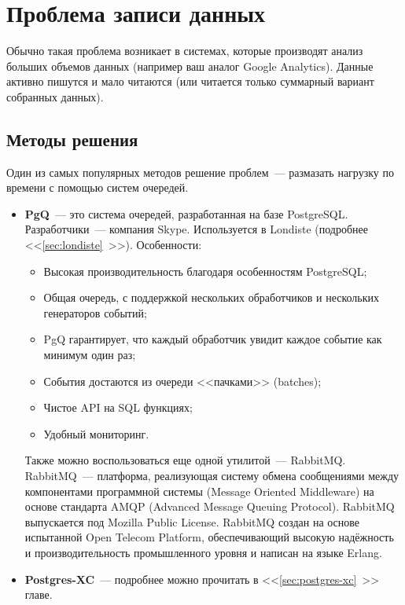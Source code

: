 \section{Проблема записи данных}

Обычно такая проблема возникает в системах, которые производят анализ больших объемов данных (например ваш аналог Google Analytics). Данные активно пишутся и мало читаются (или читается только суммарный вариант собранных данных).

\subsection{Методы решения}

Один из самых популярных методов решение проблем~--- размазать нагрузку по времени с помощью систем очередей.

\begin{itemize}
  \item \textbf{PgQ}~--- это система очередей, разработанная на базе PostgreSQL. Разработчики~--- компания Skype. Используется в Londiste (подробнее <<\ref{sec:londiste}~>>). Особенности:
  \begin{itemize}
    \item Высокая производительность благодаря особенностям PostgreSQL;
    \item Общая очередь, с поддержкой нескольких обработчиков и нескольких генераторов событий;
    \item PgQ гарантирует, что каждый обработчик увидит каждое событие как минимум один раз;
    \item События достаются из очереди <<пачками>> (batches);
    \item Чистое API на SQL функциях;
    \item Удобный мониторинг.
  \end{itemize}

  Также можно воспользоваться еще одной утилитой~--- RabbitMQ. RabbitMQ~--- платформа, реализующая систему обмена сообщениями между компонентами программной системы (Message Oriented Middleware) на основе стандарта AMQP (Advanced Message Queuing Protocol). RabbitMQ выпускается под Mozilla Public License. RabbitMQ создан на основе испытанной Open Telecom Platform, обеспечивающий высокую надёжность и производительность промышленного уровня и написан на языке Erlang.

  \item \textbf{Postgres-XC}~--- подробнее можно прочитать в <<\ref{sec:postgres-xc}~>> главе.
\end{itemize}